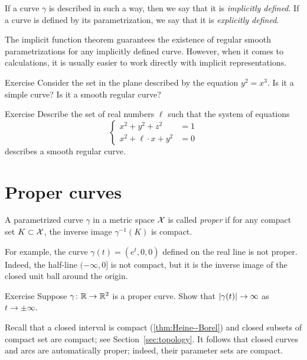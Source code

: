 If a curve $\gamma$ is described in such a way,
then we say that it is \emph{implicitly defined}.
If a curve is defined by its parametrization, we say that it is \emph{explicitly defined}.

The implicit function theorem guarantees the existence of regular smooth parametrizations for any implicitly defined curve.
However, when it comes to calculations, it is usually easier to work directly with implicit representations. 

\begin{thm}{Exercise}\label{ex:y^2=x^3}
Consider the set in the plane described by the equation
$y^2=x^3$.
Is it a simple curve?
Is it a smooth regular curve?
\end{thm}

\begin{thm}{Exercise}\label{ex:viviani}
Describe the set of real numbers $\ell$
such that the system of equations
\[\begin{cases}
x^2+y^2+z^2&=1
\\
x^2+\ell\cdot x+y^2&=0
\end{cases}\]
describes a smooth regular curve.
\end{thm}

\section{Proper curves}\label{sec:proper-curves}

A parametrized curve $\gamma$ in a metric space $\mathcal{X}$ is called \emph{proper} if for any compact set $K \subset \mathcal{X}$, the inverse image $\gamma^{-1}(K)$ is compact.

For example, the curve $\gamma(t)=(e^t,0,0)$ defined on the real line is not proper.
Indeed, the half-line $(-\infty,0]$ is not compact, but it is the inverse image of the closed unit ball around the origin.

\begin{thm}{Exercise}\label{ex:open-curve}
Suppose $\gamma\colon\mathbb{R}\to\mathbb{R}^2$ is a proper curve.
Show that  $|\gamma(t)|\z\to\infty$ as $t\to\pm\infty$.
\end{thm}


Recall that a closed interval is compact (\ref{thm:Heine--Borel}) and closed subsets of compact set are compact;
see Section~\ref{sec:topology}.
It follows that closed curves and arcs are automatically proper;
indeed, their parameter sets are compact.

